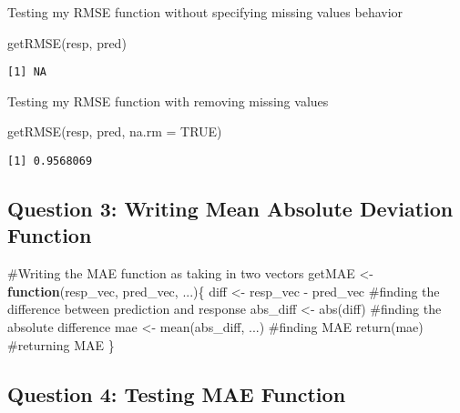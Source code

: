 \documentclass[
  letterpaper,
  DIV=11,
  numbers=noendperiod]{scrartcl}
\newenvironment{Shaded}{\begin{snugshade}}{\end{snugshade}}
\newcommand{\AttributeTok}[1]{\textcolor[rgb]{0.40,0.45,0.13}{#1}}
\newcommand{\CommentTok}[1]{\textcolor[rgb]{0.37,0.37,0.37}{#1}}
\newcommand{\ConstantTok}[1]{\textcolor[rgb]{0.56,0.35,0.01}{#1}}
\newcommand{\ControlFlowTok}[1]{\textcolor[rgb]{0.00,0.23,0.31}{\textbf{#1}}}
\newcommand{\FunctionTok}[1]{\textcolor[rgb]{0.28,0.35,0.67}{#1}}
\newcommand{\NormalTok}[1]{\textcolor[rgb]{0.00,0.23,0.31}{#1}}
\newcommand{\OtherTok}[1]{\textcolor[rgb]{0.00,0.23,0.31}{#1}}
\newcommand{\SpecialCharTok}[1]{\textcolor[rgb]{0.37,0.37,0.37}{#1}}
\begin{document}
Testing my RMSE function without specifying missing values behavior

\begin{Shaded}
\begin{Highlighting}[]
\FunctionTok{getRMSE}\NormalTok{(resp, pred)}
\end{Highlighting}
\end{Shaded}

\begin{verbatim}
[1] NA
\end{verbatim}

Testing my RMSE function with removing missing values

\begin{Shaded}
\begin{Highlighting}[]
\FunctionTok{getRMSE}\NormalTok{(resp, pred, }\AttributeTok{na.rm =} \ConstantTok{TRUE}\NormalTok{)}
\end{Highlighting}
\end{Shaded}

\begin{verbatim}
[1] 0.9568069
\end{verbatim}

\subsection{Question 3: Writing Mean Absolute Deviation
Function}\label{question-3-writing-mean-absolute-deviation-function}

\begin{Shaded}
\begin{Highlighting}[]
\CommentTok{\#Writing the MAE function as taking in two vectors}
\NormalTok{getMAE }\OtherTok{\textless{}{-}} \ControlFlowTok{function}\NormalTok{(resp\_vec, pred\_vec, ...)\{}
\NormalTok{  diff }\OtherTok{\textless{}{-}}\NormalTok{ resp\_vec }\SpecialCharTok{{-}}\NormalTok{ pred\_vec }\CommentTok{\#finding the difference between prediction and response}
\NormalTok{  abs\_diff }\OtherTok{\textless{}{-}} \FunctionTok{abs}\NormalTok{(diff) }\CommentTok{\#finding the absolute difference}
\NormalTok{  mae }\OtherTok{\textless{}{-}} \FunctionTok{mean}\NormalTok{(abs\_diff, ...) }\CommentTok{\#finding MAE}
  \FunctionTok{return}\NormalTok{(mae) }\CommentTok{\#returning MAE}
\NormalTok{\}}
\end{Highlighting}
\end{Shaded}

\subsection{Question 4: Testing MAE
Function}\label{question-4-testing-mae-function}
\end{document}
